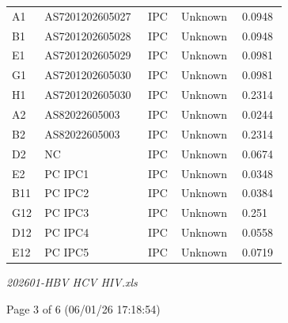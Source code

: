 \documentclass[UTF8,10pt,a4paper,fontset=fandol]{ctexart}
\begin{document}
\begin{center}
\begin{tabular}{|p{0.07\linewidth}|p{0.24\linewidth}|p{0.10\linewidth}|p{0.16\linewidth}|p{0.12\linewidth}|}
A1  & AS7201202605027 & IPC & Unknown & 0.0948 \\
B1  & AS7201202605028 & IPC & Unknown & 0.0948 \\
E1  & AS7201202605029 & IPC & Unknown & 0.0981 \\
G1  & AS7201202605030 & IPC & Unknown & 0.0981 \\
H1  & AS7201202605030 & IPC & Unknown & 0.2314 \\
A2  & AS82022605003  & IPC & Unknown & 0.0244 \\
B2  & AS82022605003  & IPC & Unknown & 0.2314 \\
D2  & NC              & IPC & Unknown & 0.0674 \\
E2  & PC IPC1         & IPC & Unknown & 0.0348 \\
B11 & PC IPC2         & IPC & Unknown & 0.0384 \\
G12 & PC IPC3         & IPC & Unknown & 0.251 \\
D12 & PC IPC4         & IPC & Unknown & 0.0558 \\
E12 & PC IPC5         & IPC & Unknown & 0.0719 \\
\hline
\end{tabular}
\end{center}

\noindent\textit{202601-HBV HCV HIV.xls}

\hfill Page 3 of 6 (06/01/26 17:18:54)


\newpage

\begin{center}
\end{center}
\end{document}
